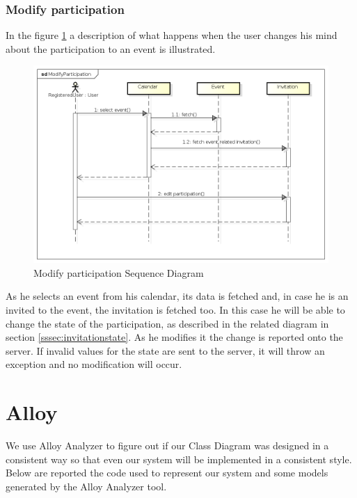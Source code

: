 \subsubsection{Modify participation}
In the figure \ref{fig:modpartseqdiag} a description of what happens when the user changes his mind about the participation to an event is illustrated.
\begin{center}
 \begin{figure}[H]
    \includegraphics[width=1\textwidth]{../UMLDiagram/sequence/ModifyParticipation/ModifyParticipation.png}
    \caption{Modify participation Sequence Diagram}
     \label{fig:modpartseqdiag}
     \end{figure}
   \end{center}
As he selects an event from his calendar, its data is fetched and, in case he is an invited to the event, the invitation is fetched too. In this case he will be able to change the state of the participation, as described in the related diagram in section \ref{sssec:invitationstate}. As he modifies it the change is reported onto the server. If invalid values for the state are sent to the server, it will throw an exception and no modification will occur. 
\section{Alloy}
We use Alloy Analyzer to figure out if our Class Diagram was designed in a consistent way so that even our system will be implemented in a consistent style.\\
Below are reported the code used to represent our system and some models generated by the Alloy Analyzer tool.
